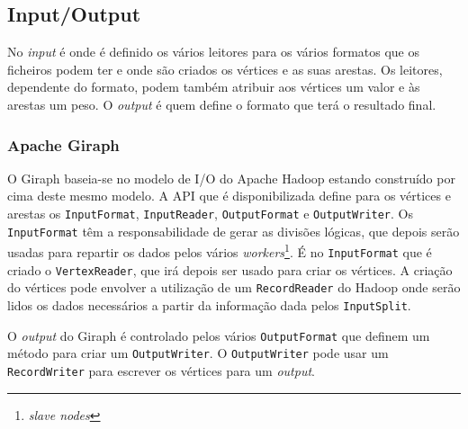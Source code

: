 \newpage
\subsection{Input/Output}
No \textit{input} é onde é definido os vários leitores para os vários formatos que os ficheiros podem ter e onde são criados os vértices e as suas arestas. Os leitores, dependente do formato, podem também atribuir aos vértices um valor e às arestas um peso.
O \textit{output} é quem define	 o formato que terá o resultado final.
\subsubsection*{Apache Giraph}
O Giraph baseia-se no modelo de I/O do Apache Hadoop estando construído por cima deste mesmo modelo.
A API que é disponibilizada define para os vértices e arestas os \texttt{InputFormat}, \texttt{InputReader}, \texttt{OutputFormat} e \texttt{OutputWriter}.
Os \texttt{InputFormat} têm a responsabilidade de gerar as divisões lógicas, que depois serão usadas para repartir os dados pelos vários
\textit{workers}\footnote{\textit{slave nodes}}. É no \texttt{InputFormat} que é criado o \texttt{VertexReader}, que irá depois ser usado para criar os vértices.
A criação do vértices pode envolver a utilização de um \texttt{RecordReader} do Hadoop onde serão lidos os dados necessários a partir da informação dada pelos \texttt{InputSplit}.

O \textit{output} do Giraph é controlado pelos vários \texttt{OutputFormat} que definem um método para criar um \texttt{OutputWriter}. O \texttt{OutputWriter} pode usar um \texttt{RecordWriter}
para escrever os vértices para um \textit{output}.

